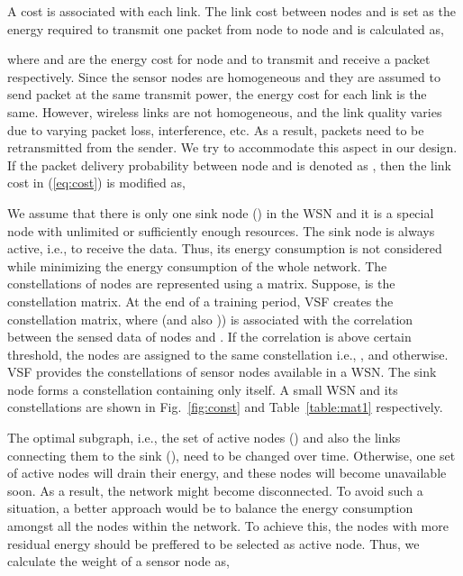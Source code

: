 \documentclass[conference]{IEEEtran}
\begin{document}
A cost is associated with each link. The link cost between nodes  and  is set as the energy required to transmit one packet from node  to node  and is calculated as, 
\newcommand{\twopartdef}[4]
{
	\left\{
		\begin{array}{ll}
			#1 & #2 \\
			#3 & #4
		\end{array}
	\right.
}

where  and  are the energy cost for node  and  to transmit and receive a packet respectively. Since the sensor nodes are homogeneous and they are assumed to send packet at the same transmit power, the energy cost for each link is the same. However, wireless links are not homogeneous, and the link quality varies due to varying packet loss, interference, etc. As a result, packets need to be retransmitted from the sender. We try to accommodate this aspect in our design. If the packet delivery probability between node  and  is denoted as , then the link cost in (\ref{eq:cost}) is modified as,

We assume that there is only one sink node () in the WSN and it is a special node with unlimited or sufficiently enough resources. The sink node is always active, i.e.,  to receive the data. Thus, its energy consumption is not considered while minimizing the energy consumption of the whole network. The constellations of nodes are represented using a matrix. Suppose,  is the constellation matrix. At the end of a training period, VSF creates the constellation matrix, where  (and also )) is associated with the correlation between the sensed data of nodes  and . If the correlation is above certain threshold, the nodes are assigned to the same constellation i.e., , and  otherwise. VSF provides the constellations of sensor nodes available in a WSN. The sink node forms a constellation containing only itself. A small WSN and its constellations are shown in Fig.~\ref{fig:const} and Table~\ref{table:mat1} respectively.

The optimal subgraph, i.e., the set of active nodes () and also the links connecting them to the sink (), need to be changed over time. Otherwise, one set of active nodes will drain their energy, and these nodes will become unavailable soon. As a result, the network might become disconnected. To avoid such a situation, a better approach would be to balance the energy consumption amongst all the nodes within the network. To achieve this, the nodes with more residual energy should be preffered to be selected as active node. Thus, we calculate the weight of a sensor node  as,
\end{document}
